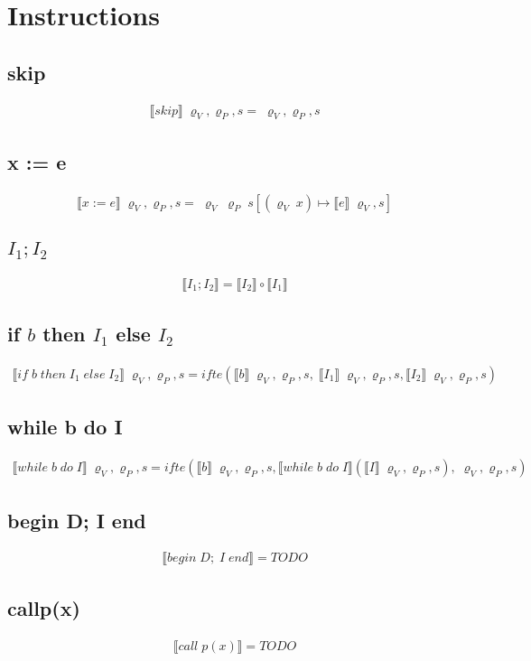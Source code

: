 \documentclass[12pt]{article}
\newcommand{\sem}[1]{\llbracket #1 \rrbracket}
\newcommand{\srod}{\;\varrho_{V}, s}
\newcommand{\srodP}{\;\varrho_{V}, \varrho_{P}, s}
\newcommand{\PV}{\; \varrho_{V} \; \varrho_{P}}
\newcommand{\eq}[2]{\subsection{#1} \begin{gather*} #2 \end{gather*}}
\begin{document}
\section{Instructions}


\eq {skip} {
	\sem{skip} \srodP = \srodP
}

\eq {x := e} {
	\sem{x := e} \srodP = \PV \; s[(\varrho_V \; x) \mapsto \sem{e} \srod]
}

\eq {$I_1;I_2$} {
	\sem{I_1;I_2} = \sem{I_2} \circ \sem{I_1}
}

\eq {if $b$ then $I_1$ else $I_2$} {
	\sem{if\;b\;then\;I_1\;else\;I_2} \srodP = ifte(\sem{b}\srodP,\;\sem{I_1}\srodP, \sem{I_2}\srodP )
}


\eq {while b do I} {
	\sem{while\;b\;do\;I} \srodP = ifte(\sem{b}\srodP, \sem{while\;b\;do\;I} (\sem{I} \srodP),\srodP)
}

\eq {begin D; I end} {
	\sem{begin\;D;\;I\;end} = TODO
}

\eq {call\;p(x)} {
	\sem{call\;p(x)} = TODO
}
\end{document}
